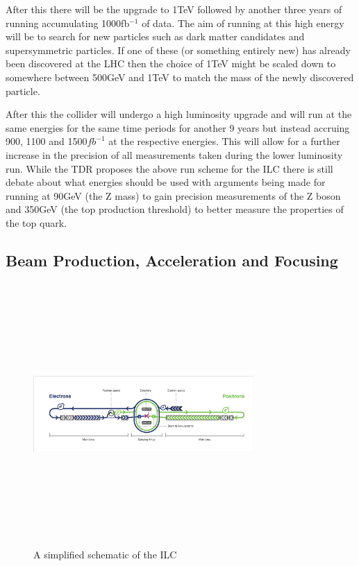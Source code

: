 After this there will be the upgrade to 1TeV followed by another three years of running accumulating 1000fb${^{-1}}$ of data. The aim of running at this high energy will be to search for new particles such as dark matter candidates and supersymmetric particles. If one of these (or something entirely new) has already been discovered at the \ac{LHC} then the choice of 1TeV might be scaled down to somewhere between 500GeV and 1TeV to match the mass of the newly discovered particle.

After this the collider will undergo a high luminosity upgrade and will run at the same energies for the same time periods for another 9 years but instead accruing 900, 1100 and 1500${fb^{-1}}$ at the respective energies. This will allow for a further increase in the precision of all measurements taken during the lower luminosity run.
While the \ac{TDR} proposes the above run scheme for the \ac{ILC} there is still debate about what energies should be used with arguments being made for running at 90GeV (the Z mass) to gain precision measurements of the Z boson and 350GeV (the top production threshold) to better measure the properties of the top quark.

\subsection{Beam Production, Acceleration and Focusing}
\label{ILC:BEAM}

\begin{figure}
  \centering
  \includegraphics[width=0.75\textwidth,height=10cm,keepaspectratio]{Experiments/fig/ILC_Simplified}
  \caption[Schematic Of The ILC]{A simplified schematic of the ILC}
  \label{Fig:ILCsimple}
\end{figure}

